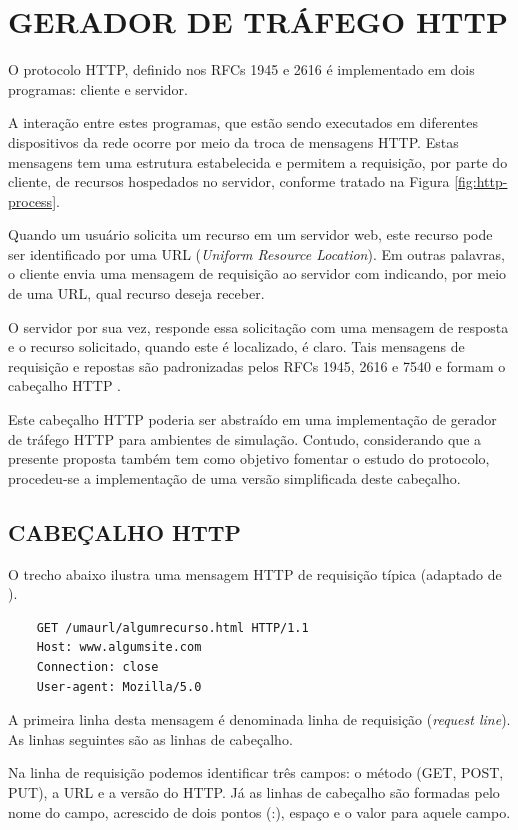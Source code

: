 \section{GERADOR DE TRÁFEGO HTTP}

O protocolo HTTP, definido nos RFCs 1945 e 2616 é implementado em dois programas: cliente e servidor.

A interação entre estes programas, que estão sendo executados em diferentes dispositivos da rede ocorre por meio da troca de mensagens HTTP. Estas mensagens tem uma estrutura estabelecida e permitem a requisição, por parte do cliente, de recursos hospedados no servidor, conforme tratado na Figura \ref{fig:http-process}.

Quando um usuário solicita um recurso em um servidor web, este recurso pode ser identificado por uma URL (\textit{Uniform Resource Location}). Em outras palavras, o cliente envia uma mensagem de requisição ao servidor com indicando, por meio de uma URL, qual recurso deseja receber.

O servidor por sua vez, responde essa solicitação com uma mensagem de resposta e o recurso solicitado, quando este é localizado, é claro. Tais mensagens de requisição e repostas são padronizadas pelos RFCs 1945, 2616 e 7540 e formam o cabeçalho HTTP \cite{Kurose2013}.

Este cabeçalho HTTP poderia ser abstraído em uma implementação de gerador de tráfego HTTP para ambientes de simulação. Contudo, considerando que a presente proposta também tem como objetivo fomentar o estudo do protocolo, procedeu-se a implementação de uma versão simplificada deste cabeçalho.


\subsection{CABEÇALHO HTTP}

O trecho abaixo ilustra uma mensagem HTTP de requisição típica (adaptado de \cite{Kurose2013}). 

\begin{verbatim}
	GET /umaurl/algumrecurso.html HTTP/1.1
	Host: www.algumsite.com
	Connection: close
	User-agent: Mozilla/5.0
\end{verbatim}

A primeira linha desta mensagem é denominada linha de requisição (\textit{request line}). As linhas seguintes são as linhas de cabeçalho. 

Na linha de requisição podemos identificar três campos: o método (GET, POST, PUT), a URL e a versão do HTTP. Já as linhas de cabeçalho são formadas pelo nome do campo, acrescido de dois pontos (:), espaço e o valor para aquele campo.

